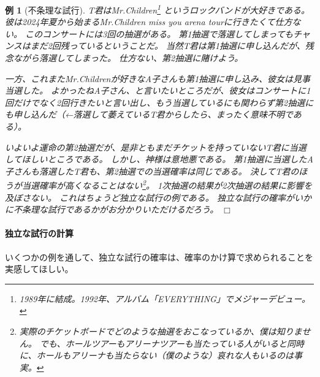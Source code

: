 \documentclass[12pt]{ltjsarticle}\usepackage{ifthen}\newcounter{enlarge}\setcounter{enlarge}{1}
\def\qed{\hfill $\Box$}
\newtheorem{eg}{例}
\begin{document}
\begin{eg}[不条理な試行]
  T君はMr.Children\footnote{%
  1989年に結成。1992年、アルバム「EVERYTHING」でメジャーデビュー。
  }
  というロックバンドが大好きである。
  彼は2024年夏から始まるMr.Children miss you arena tourに行きたくて仕方ない。
  このコンサートには3回の抽選がある。
  第1抽選で落選してしまってもチャンスはまだ2回残っているということだ。
  当然T君は第1抽選に申し込んだが、残念ながら落選してしまった。
  仕方ない、第2抽選に賭けよう。

  一方、これまたMr.Childrenが好きなA子さんも第1抽選に申し込み、彼女は見事当選した。
  よかったねA子さん、と言いたいところだが、彼女はコンサートに1回だけでなく2回行きたいと言い出し、もう当選しているにも関わらず第2抽選にも申し込んだ（←落選して萎えているT君からしたら、まったく意味不明である）。
  
  いよいよ運命の第2抽選だが、是非ともまだチケットを持っていないT君に当選してほしいところである。
  しかし、神様は意地悪である。
  第1抽選に当選したA子さんも落選したT君も、第2抽選での当選確率は同じである。
  決してT君のほうが当選確率が高くなることはない\footnote{%
    実際のチケットボードでどのような抽選をおこなっているか、僕は知りません。
    でも、ホールツアーもアリーナツアーも当たっている人がいると同時に、ホールもアリーナも当たらない（僕のような）哀れな人もいるのは事実。
  }。
  1次抽選の結果が2次抽選の結果に影響を及ぼさない。
  これはちょうど独立な試行の例である。
  独立な試行の確率がいかに不条理な試行であるかがお分かりいただけるだろう。
\qed\end{eg}

\paragraph{独立な試行の計算}

いくつかの例を通して、独立な試行の確率は、確率のかけ算で求められることを実感してほしい。
\end{document}
